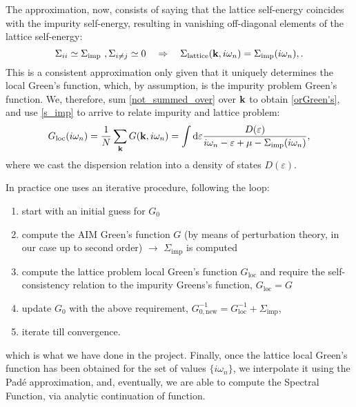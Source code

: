 The approximation, now, consists of saying that the lattice self-energy coincides with the impurity self-energy, resulting in vanishing off-diagonal elements of the lattice self-energy:
%
\begin{equation}
\Sigma_{ii} \simeq \Sigma_{\text{imp}} ~ , \Sigma_{i\neq j} \simeq 0
\quad \Rightarrow
\quad
\Sigma_{\text{lattice}}(\bold{k},i\omega_n) = \Sigma_{\text{imp}}(i\omega_n)
, .
\end{equation}
%
This is a consistent approximation only given that it uniquely determines the local Green's function, which, by assumption, is the impurity problem Green's function. We, therefore, sum \eqref{not_summed_over} over $\bold{k}$ to obtain \eqref{orGreen's}, and use \eqref{s_imp} to arrive to relate impurity and lattice problem:
%
\begin{equation} \label{Gloc_dos}
G_{\text{loc}}(i\omega_n) = \frac{1}{N} \sum_{\bold{k}} G(\bold{k},i\omega_n) 
 = \int \dif \varepsilon \frac{D(\varepsilon)}{i\omega_n - \varepsilon + \mu - \Sigma_{\text{imp}}(i\omega_n)},
\end{equation}
%
where we cast the dispersion relation into a density of states $D(\varepsilon)$.

In practice one uses an iterative procedure, following the loop: 
\begin{enumerate}
\item start with an initial guess for $G_0$
\item compute the AIM Green's function $G$ (by means of perturbation theory, in our case up to second order) $\rightarrow$ $\Sigma_{\text{imp}}$ is computed
\item compute the lattice problem local Green's function $G_{\text{loc}}$ and require the self-consistency relation to the impurity Greens's function, $G_{\text{loc}} = G$ 
\item update $G_0$ with the above requirement, 
$G_{0,\text{new}}^{-1} = G_{\text{loc}}^{-1} + \Sigma_{\text{imp}}$,
\item iterate till convergence.
\end{enumerate}
which is what we have done in the project. Finally, once the lattice local Green's function has been obtained for the set of values $\{i\omega_n\}$, we interpolate it using the Padé approximation, and, eventually, we are able to compute the Spectral Function, via analytic continuation of function.



